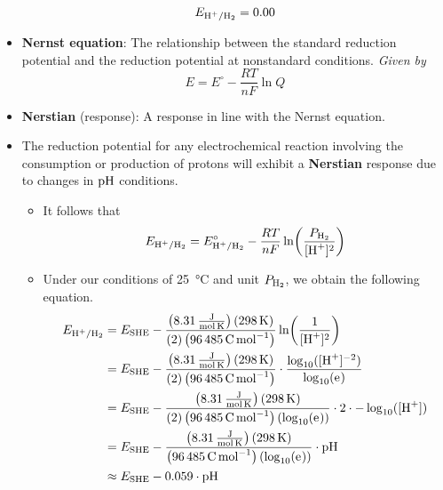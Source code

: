 \documentclass[../notes.tex]{subfiles}
\begin{document}
\begin{itemize}
\begin{equation*}
        E_{\ce{H+}/\ce{H2}} = 0.00
    \end{equation*}
    \item \textbf{Nernst equation}: The relationship between the standard reduction potential and the reduction potential at nonstandard conditions. \emph{Given by}
    \begin{equation*}
        E = E^\circ-\frac{RT}{nF}\ln Q
    \end{equation*}
    \item \textbf{Nerstian} (response): A response in line with the Nernst equation.
    \item The reduction potential for any electrochemical reaction involving the consumption or production of protons will exhibit a \textbf{Nerstian} response due to changes in $\operatorname{pH}$ conditions.
    \begin{itemize}
        \item It follows that
        \begin{equation*}
            E_{\ce{H+}/\ce{H2}} = E_{\ce{H+}/\ce{H2}}^\circ-\frac{RT}{nF}\ln(\frac{P_{\ce{H2}}}{[\ce{H+}]^2})
        \end{equation*}
        \item Under our conditions of \SI{25}{\celsius} and unit $P_{\ce{H2}}$, we obtain the following equation.
        \begin{align*}
            E_{\ce{H+}/\ce{H2}} &= E_\text{SHE}-\frac{\left( \SI[per-mode=fraction]{8.31}{\joule\per\mole\per\kelvin} \right)\left( \SI{298}{\kelvin} \right)}{(2)\left( \SI{96485}{\coulomb\per\mole} \right)}\ln(\frac{1}{[\ce{H+}]^2})\\
            &= E_\text{SHE}-\frac{\left( \SI[per-mode=fraction]{8.31}{\joule\per\mole\per\kelvin} \right)\left( \SI{298}{\kelvin} \right)}{(2)\left( \SI{96485}{\coulomb\per\mole} \right)}\cdot\frac{\log_{10}([\ce{H+}]^{-2})}{\log_{10}(\e)}\\
            &= E_\text{SHE}-\frac{\left( \SI[per-mode=fraction]{8.31}{\joule\per\mole\per\kelvin} \right)\left( \SI{298}{\kelvin} \right)}{(2)\left( \SI{96485}{\coulomb\per\mole} \right)(\log_{10}(\e))}\cdot 2\cdot -\log_{10}([\ce{H+}])\\
            &= E_\text{SHE}-\frac{\left( \SI[per-mode=fraction]{8.31}{\joule\per\mole\per\kelvin} \right)\left( \SI{298}{\kelvin} \right)}{\left( \SI{96485}{\coulomb\per\mole} \right)(\log_{10}(\e))}\cdot\pH\\
            &\approx E_\text{SHE}-0.059\cdot\pH
        \end{align*}

\end{itemize}
\end{itemize}
\end{document}
